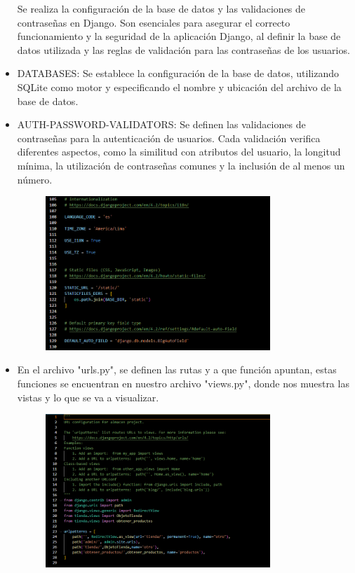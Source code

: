 \documentclass{article}
\begin{document}
 
\begin{itemize}
Se realiza la configuración de la base de datos y las validaciones de contraseñas en Django. Son esenciales para asegurar el correcto funcionamiento y la seguridad de la aplicación Django, al definir la base de datos utilizada y las reglas de validación para las contraseñas de los usuarios.
  \item DATABASES: Se establece la configuración de la base de datos, utilizando SQLite como motor y especificando el nombre y ubicación del archivo de la base de datos.
  \item AUTH-PASSWORD-VALIDATORS: Se definen las validaciones de contraseñas para la autenticación de usuarios. Cada validación verifica diferentes aspectos, como la similitud con atributos del usuario, la longitud mínima, la utilización de contraseñas comunes y la inclusión de al menos un número.

	\begin{figure}[H]
		\centering
		\includegraphics[width=0.8\textwidth,keepaspectratio]{Latex/img/settings5.png}
	\end{figure}
	\end{itemize}
 \begin{itemize}
		\item En el archivo "urls.py", se definen las rutas y a que función apuntan, estas funciones se encuentran en nuestro archivo "views.py", donde nos muestra las vistas y lo que se va a visualizar.
	\begin{figure}[H]
		\centering
		\includegraphics[width=0.8\textwidth,keepaspectratio]{Latex/img/urls.png}
	\end{figure}
	\end{itemize}
\end{document}
